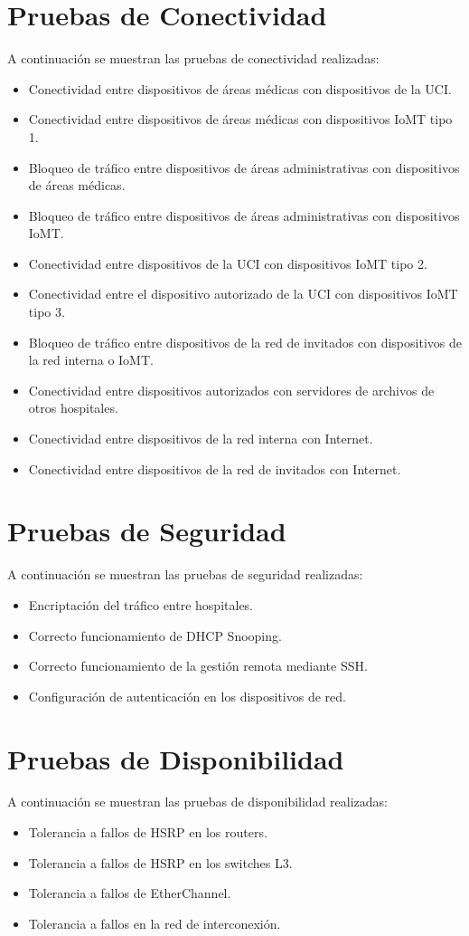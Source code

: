 \section{Pruebas de Conectividad}
A continuación se muestran las pruebas de conectividad realizadas:
\begin{itemize}
    \item Conectividad entre dispositivos de áreas médicas con dispositivos de la UCI.
    \item Conectividad entre dispositivos de áreas médicas con dispositivos IoMT tipo 1.
    \item Bloqueo de tráfico entre dispositivos de áreas administrativas con dispositivos de áreas médicas.
    \item Bloqueo de tráfico entre dispositivos de áreas administrativas con dispositivos IoMT.
    \item Conectividad entre dispositivos de la UCI con dispositivos IoMT tipo 2.
    \item Conectividad entre el dispositivo autorizado de la UCI con dispositivos IoMT tipo 3.
    \item Bloqueo de tráfico entre dispositivos de la red de invitados con dispositivos de la red interna o IoMT.
    \item Conectividad entre dispositivos autorizados con servidores de archivos de otros hospitales.
    \item Conectividad entre dispositivos de la red interna con Internet.
    \item Conectividad entre dispositivos de la red de invitados con Internet.
\end{itemize}

\section{Pruebas de Seguridad}
A continuación se muestran las pruebas de seguridad realizadas:
\begin{itemize}
    \item Encriptación del tráfico entre hospitales.
    \item Correcto funcionamiento de DHCP Snooping.
    \item Correcto funcionamiento de la gestión remota mediante SSH.
    \item Configuración de autenticación en los dispositivos de red.
\end{itemize}

\section{Pruebas de Disponibilidad}
A continuación se muestran las pruebas de disponibilidad realizadas:
\begin{itemize}
    \item Tolerancia a fallos de HSRP en los routers.
    \item Tolerancia a fallos de HSRP en los switches L3.
    \item Tolerancia a fallos de EtherChannel.
    \item Tolerancia a fallos en la red de interconexión.
\end{itemize}

